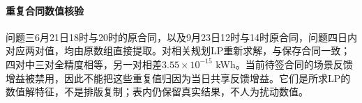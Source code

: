 
\paragraph{重复合同数值核验}
问题三6月21日18时与20时的原合同，以及9月23日12时与14时原合同，问题四日内对应两对值，均由原数组直接提取。对相关规划LP重新求解，与保存合同一致；四对中三对全精度相等，另一对相差$3.55\times10^{-15}$ kWh。当前待签合同的场景反馈增益被禁用，因此不能把这些重复值归因为当日共享反馈增益。它们是所求LP的数值解特征，不是排版复制；表内仍保留真实结果，不人为扰动数值。
